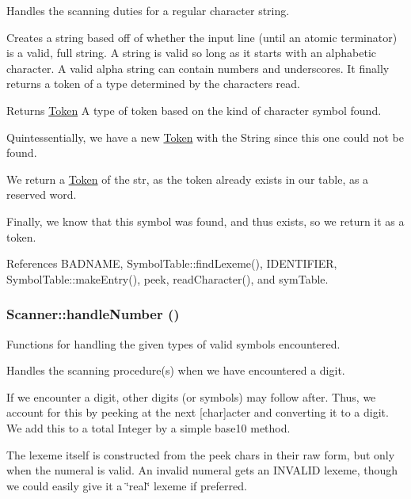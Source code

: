 Handles the scanning duties for a regular character string. 

Creates a string based off of whether the input line (until an atomic terminator) is a valid, full string. A string is valid so long as it starts with an alphabetic character. A valid alpha string can contain numbers and underscores. It finally returns a token of a type determined by the characters read. \begin{DoxyReturn}{Returns}
\hyperlink{classToken}{Token} A type of token based on the kind of character symbol found. 
\end{DoxyReturn}


Quintessentially, we have a new \hyperlink{classToken}{Token} with the String since this one could not be found.

We return a \hyperlink{classToken}{Token} of the str, as the token already exists in our table, as a reserved word.

Finally, we know that this symbol was found, and thus exists, so we return it as a token. 



References BADNAME, SymbolTable::findLexeme(), IDENTIFIER, SymbolTable::makeEntry(), peek, readCharacter(), and symTable.

\hypertarget{classScanner_a7e893ad25781c012e020998b327828bd}{
\subsubsection[{handleNumber}]{ Scanner::handleNumber ()}}
\label{classScanner_a7e893ad25781c012e020998b327828bd}


Functions for handling the given types of valid symbols encountered. 

Handles the scanning procedure(s) when we have encountered a digit.

If we encounter a digit, other digits (or symbols) may follow after. Thus, we account for this by peeking at the next \mbox{[}char\mbox{]}acter and converting it to a digit. We add this to a total Integer by a simple base10 method.

The lexeme itself is constructed from the peek chars in their raw form, but only when the numeral is valid. An invalid numeral gets an INVALID lexeme, though we could easily give it a \char`\"{}real\char`\"{} lexeme if preferred.

